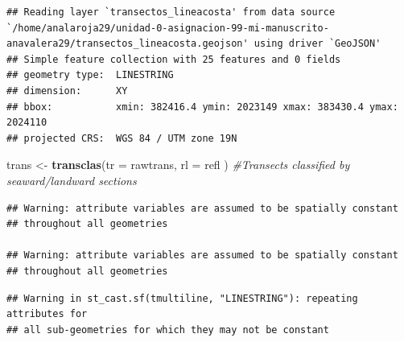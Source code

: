 \documentclass[11pt,]{article}
\newenvironment{Shaded}{\begin{snugshade}}{\end{snugshade}}
\newcommand{\KeywordTok}[1]{\textcolor[rgb]{0.13,0.29,0.53}{\textbf{#1}}}
\newcommand{\DataTypeTok}[1]{\textcolor[rgb]{0.13,0.29,0.53}{#1}}
\newcommand{\StringTok}[1]{\textcolor[rgb]{0.31,0.60,0.02}{#1}}
\newcommand{\CommentTok}[1]{\textcolor[rgb]{0.56,0.35,0.01}{\textit{#1}}}
\newcommand{\NormalTok}[1]{#1}
\begin{document}
\begin{verbatim}
## Reading layer `transectos_lineacosta' from data source `/home/analaroja29/unidad-0-asignacion-99-mi-manuscrito-anavalera29/transectos_lineacosta.geojson' using driver `GeoJSON'
## Simple feature collection with 25 features and 0 fields
## geometry type:  LINESTRING
## dimension:      XY
## bbox:           xmin: 382416.4 ymin: 2023149 xmax: 383430.4 ymax: 2024110
## projected CRS:  WGS 84 / UTM zone 19N
\end{verbatim}

\begin{Shaded}
\begin{Highlighting}[]
\NormalTok{trans <-}\StringTok{ }\KeywordTok{transclas}\NormalTok{(}\DataTypeTok{tr =}\NormalTok{ rawtrans, }\DataTypeTok{rl =}\NormalTok{ refl}
\NormalTok{                   ) }\CommentTok{#Transects classified by seaward/landward sections}
\end{Highlighting}
\end{Shaded}

\begin{verbatim}
## Warning: attribute variables are assumed to be spatially constant
## throughout all geometries

## Warning: attribute variables are assumed to be spatially constant
## throughout all geometries
\end{verbatim}

\begin{verbatim}
## Warning in st_cast.sf(tmultiline, "LINESTRING"): repeating attributes for
## all sub-geometries for which they may not be constant
\end{verbatim}
\end{document}
